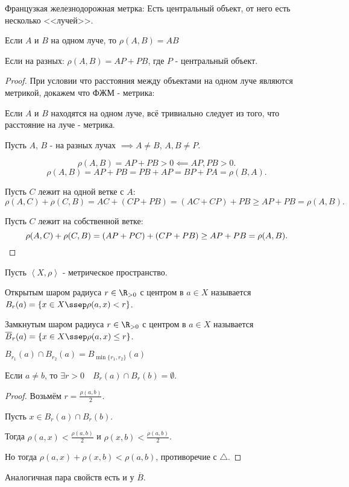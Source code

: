 \begin{example} \thmslashn

    Французкая железнодорожная метрка: Есть центральный объект, от него есть несколько <<лучей>>. 

    Если $A$ и $B$ на одном луче, то $\rho(A, B) = AB$

    Если на разных: $\rho(A, B) = AP + PB$, где $P$ - центральный объект.

    \begin{proof} \thmslashn
    
        При условии что расстояния между объектами на одном луче являются метрикой, докажем что ФЖМ - метрика:

        Если $A$ и $B$ находятся на одном луче, всё тривиально следует из того, что расстояние на луче - метрика.

        Пусть $A$, $B$ - на разных лучах $ \implies A \neq B$, $A, B \neq P$.

        \[ \rho(A, B) = AP + PB > 0 \impliedby AP, PB > 0 .\]
        \[ \rho(A, B) = AP + PB = PB + AP = BP + PA = \rho(B, A) .\]

        Пусть $C$ лежит на одной ветке с $A$:
        \[ \rho(A, C) + \rho(C, B) = AC + (CP + PB) = (AC + CP) + PB \ge  AP + PB = \rho(A, B) .\]

        Пусть $C$ лежит на собственной ветке:
        \[ \rho(A, C) + \rho(C, B) = (AP + PC) + (CP + PB) \ge  AP + PB = \rho(A, B). \qedhere\] 
    \end{proof}
\end{example}
\begin{definition} \thmslashn 

    Пусть $\left<X, \rho\right>$ - метрическое пространство.

    Открытым шаром радиуса $r\in \R_{>0}$ с центром в $a\in X$ называется $B_r(a) = \{x\in X \ssep \rho(a, x) < r\}$.
    
    Замкнутым шаром радиуса $r\in \R_{>0}$ с центром в $a\in X$ называется $\overline{B}_r(a) = \{x\in X \ssep \rho(a, x) \le  r\}$.
\end{definition}
\begin{properties} \thmslashn

    $B_{r_1}(a)\cap B_{r_2}(a) = B_{\min \{r_1, r_2\} }(a)$ 

    Если $a \neq b$, то $\exists{r > 0}\quad B_{r}(a)\cap B_{r}(b) = \emptyset$.
    \begin{proof} \thmslashn
    
        Возьмём $r = \frac{\rho(a, b)}{2}$.

        Пусть $x\in B_{r}(a)\cap B_{r}(b)$.

        Тогда $\rho(a, x) < \frac{\rho(a, b)}{2}$ и $\rho(x, b) < \frac{\rho(a, b)}{2}$.

        Но тогда $\rho(a, x) + \rho(x, b) < \rho(a, b)$, противоречие с $\triangle$.
    \end{proof}

    Аналогичная пара свойств есть и у $\overline{B}$.
\end{properties}
